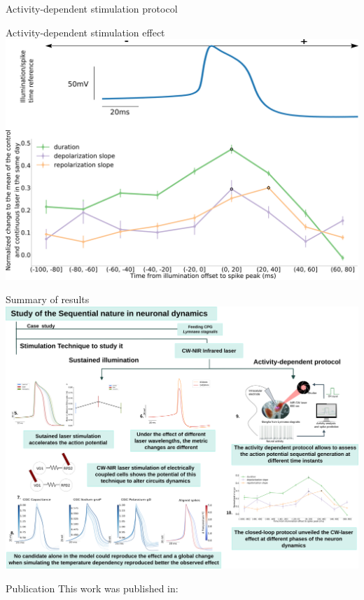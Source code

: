 \documentclass[aspectratio=43]{beamer}
\begin{document}
\begin{frame}{Activity-dependent stimulation protocol}
{	}
\end{frame}

\begin{frame}{Activity-dependent stimulation effect}
	\centering
	\includegraphics[width=\textwidth]{Images/activity-dependent results.png}
\end{frame}

\begin{frame}{Summary of results}
	\centering
	\includegraphics[width=\textwidth]{Images/laser_summary.png}
\end{frame}

\begin{frame}{Publication}
	\centering
	This work was published in:\\
\end{frame}
\end{document}
